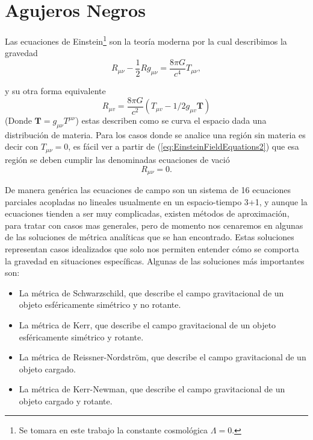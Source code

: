 \chapter{Agujeros Negros}

Las ecuaciones de Einstein\footnote{{Se tomara en este trabajo la constante cosmológica $\Lambda = 0$. }} son la teoría moderna por la cual describimos la gravedad
\begin{equation}
    R_{\mu \nu}-\frac{1}{2} R g_{\mu \nu} = \frac{8 \pi G}{c^4} T_{\mu \nu},
    \label{EinsteinFieldEquations}
\end{equation}

y su otra forma equivalente
\begin{equation}
    R_{\mu v}=\frac{8 \pi G}{c^2}\left(T_{\mu v}-1 / 2 g_{\mu v} \mathbf{T}\right)
    \label{eq:EinsteinFieldEquations2}
\end{equation}
(Donde $\mathbf{T} = g_{\mu\nu}T^{\mu\nu}$)
estas describen como se curva el espacio dada una distribución de materia. Para los casos donde se analice una región sin materia es decir con $T_{\mu\nu}=0$, es fácil ver a partir de (\ref{eq:EinsteinFieldEquations2}) que esa región se deben cumplir las denominadas ecuaciones de vació
\begin{equation}
    R_{\mu \nu} = 0.
    \label{vacuumFieldEquations}
\end{equation}

De manera genérica las ecuaciones de campo son un sistema de 16 ecuaciones parciales acopladas no lineales usualmente en un espacio-tiempo 3+1,  y aunque la ecuaciones tienden a ser muy complicadas, existen métodos de aproximación, para tratar con casos mas generales, pero de momento nos cenaremos en algunas de las  soluciones de métrica analíticas que se han encontrado. Estas soluciones representan casos idealizados que solo  nos permiten entender cómo se comporta la gravedad en situaciones específicas. Algunas de las soluciones más importantes son:

\begin{itemize}
    \item La métrica de Schwarzschild, que describe el campo gravitacional de un objeto esféricamente simétrico y no rotante.
    \item La métrica de Kerr, que describe el campo gravitacional de un objeto esféricamente simétrico y rotante.
    \item La métrica de Reissner-Nordström, que describe el campo gravitacional de un objeto cargado.
    \item La métrica de Kerr-Newman, que describe el campo gravitacional de un objeto cargado y rotante.
\end{itemize}


